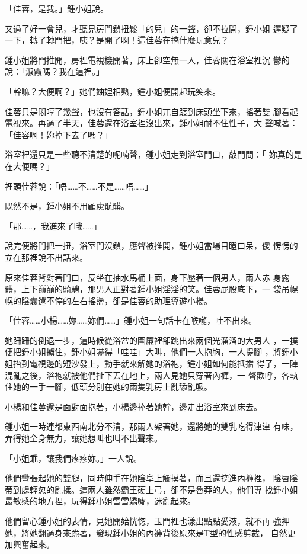 「佳蓉，是我。」鍾小姐說。

又過了好一會兒，才聽見房門鎖扭鬆「的兒」的一聲，卻不拉開，鍾小姐
遲疑了一下，轉了轉門把，咦？是開了啊！這佳蓉在搞什麼玩意兒？

鍾小姐將門推開，房裡電視機開著，床上卻空無一人，佳蓉關在浴室裡沉
鬱的說：「淑霞嗎？我在這裡。」

「幹嘛？大便啊？」她們妯娌相熟，鍾小姐便開起玩笑來。

佳蓉只是悶哼了幾聲，也沒有答話，鍾小姐兀自踱到床頭坐下來，搖著雙
腳看起電視來。再過了半天，佳蓉還在浴室裡沒出來，鍾小姐耐不住性子，大
聲喊著：「佳容啊！妳掉下去了嗎？」

浴室裡還只是一些聽不清楚的呢喃聲，鍾小姐走到浴室門口，敲門問：「
妳真的是在大便嗎？」

裡頭佳蓉說：「唔……不……不是……唔……」

既然不是，鍾小姐不用顧慮骯髒。

「那……，我進來了哦……」

說完便將門把一扭，浴室門沒鎖，應聲被推開，鍾小姐當場目瞪口呆，傻
愣愣的立在那裡說不出話來。

原來佳蓉背對著門口，反坐在抽水馬桶上面，身下壓著一個男人，兩人赤
身露體，上下巔巔的騎騁，那男人正對著鍾小姐淫淫的笑。佳蓉屁股底下，一
袋吊幌幌的陰囊還不停的左右搖盪，卻是佳蓉的助理導遊小楊。

「佳蓉……小楊……妳……妳們……」鍾小姐一句話卡在喉嚨，吐不出來。

她跚跚的倒退一步，這時候從浴盆的圍簾裡卻跳出來兩個光溜溜的大男人
，一撲便把鍾小姐擄住，鍾小姐嚇得「哇哇」大叫，他們一人抱胸，一人提腳
，將鍾小姐抬到電視邊的短沙發上，動手就來解她的浴袍，鍾小姐如何能抵擋
得了，一陣混亂之後，浴袍就被他們扯下丟在地上，兩人見她只穿著內褲，一
聲歡呼，各執住她的一手一腳，低頭分別在她的兩隻乳房上亂舔亂吸。

小楊和佳蓉還是面對面抱著，小楊邊捧著她幹，邊走出浴室來到床去。

鍾小姐一時連都東西南北分不清，那兩人架著她，還將她的雙乳吃得津津
有味，弄得她全身無力，讓她想叫也叫不出聲來。

「小姐乖，讓我們疼疼妳。」一人說。

他們彎張起她的雙腿，同時伸手在她陰阜上觸摸著，而且還挖進內褲裡，
陰唇陰蒂到處輕忽的亂揉。這兩人雖然霸王硬上弓，卻不是魯莽的人，他們專
找鍾小姐最敏感的地方捏，玩得鍾小姐雪雪嬌噓，迷亂起來。

他們留心鍾小姐的表情，見她開始恍惚，玉門裡也漾出點點愛液，就不再
強押她，將她翻過身來跪著，發現鍾小姐的內褲背後原來是T型的性感剪裁，
自然更加興奮起來。

